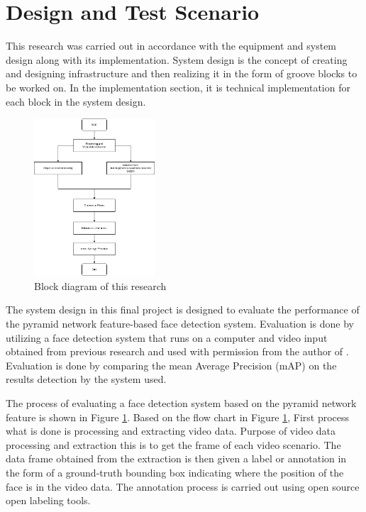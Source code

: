 \section{Design and Test Scenario}
\label{sec:arsitektur}


This research was carried out in accordance with the equipment and system design along with its implementation.
System design is the concept of creating and designing infrastructure and then realizing it
in the form of groove blocks to be worked on. In the implementation section, it is
technical implementation for each block in the system design.

\begin{figure} [ht]
  \centering
  \includegraphics[width=0.4\textwidth]{gambar/blockdiagram.png}

  \caption{Block diagram of this research}
  \label{fig:blockdiagram}
\end{figure}

The system design in this final project is designed to evaluate the performance of the pyramid network feature-based face detection system. Evaluation is done by
utilizing a face detection system that runs on a computer 
and video input obtained from previous research and used with permission from the author of \citep{nugrohoevalution2016}. 
Evaluation is done by comparing the mean Average Precision (mAP) on the results detection by the system used.

The process of evaluating a face detection system based on the pyramid network feature is shown in Figure \ref{fig:blockdiagram}.
Based on the flow chart in Figure \ref{fig:blockdiagram},
First process
what is done is processing and extracting video data. Purpose of video data processing and extraction
this is to get the frame of each video scenario.
The data frame obtained from the extraction is then given a label or annotation in the form of a ground-truth bounding box indicating where
the position of the face is in the video data.
The annotation process is carried out using open source open labeling tools.

